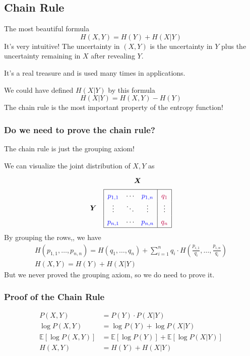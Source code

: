 \documentclass{article}
\begin{document}
\subsection{Chain Rule}

The most beautiful formula 
\[
H(X,Y) =H(Y) + H(X|Y)
\]
It's very intuitive! The uncertainty in $(X,Y)$ is the uncertainty in $Y$ plus the uncertainty remaining in $X$ after revealing $Y$.

It's a real treasure and is used many times in applications. 

We could have defined $H(X|Y)$ by this formula 
\[
H(X|Y) = H(X,Y) - H(Y)
\]
The chain rule is the most important property of the entropy function!

\subsubsection{Do we need to prove the chain rule?}

The chain rule is just the grouping axiom!

We can visualize the joint distribution of $X,Y$ as
\[
\renewcommand{\arraystretch}{1.4}
\begin{array}{cc}
 & \boldsymbol{X} \\[4pt]
\boldsymbol{Y} &
\begin{array}{|ccc|c|}
\hline
\color{blue}p_{1,1} & \cdots & \color{blue}p_{1,n} & \color{purple}q_1 \\
\vdots & \ddots & \vdots & \vdots \\
\color{blue}p_{n,1} & \cdots & \color{blue}p_{n,n} & \color{purple}q_n \\
\hline
\end{array}
\end{array}
\]
By grouping the rows,, we have
\begin{gather*}
    H\left(p_{1,1},\ldots,p_{n,n}\right) = H\left(q_1,\ldots, q_n\right) + \sum_{i=1 }^{n}q_i \cdot H\left(\frac{p_{i,1}}{q_i},\ldots,\frac{p_{i,n}}{q_i}\right)\\
    H(X,Y)=H(Y) + H(X|Y)
\end{gather*}
But we never proved the grouping axiom, so we do need to prove it.

\subsubsection{Proof of the Chain Rule}

\begin{align*}
    P(X,Y) &= P(Y)\cdot P(X|Y)\\
    \log P(X,Y) &= \log P(Y) + \log P(X|Y)\\
    \mathbb{E} \left[\log P(X,Y) \right]&= \mathbb{E}\left[\log P(Y)\right] + \mathbb{E}\left[\log P(X|Y)\right]\\
    H(X,Y) &=H(Y) + H(X|Y)
\end{align*}
\end{document}
